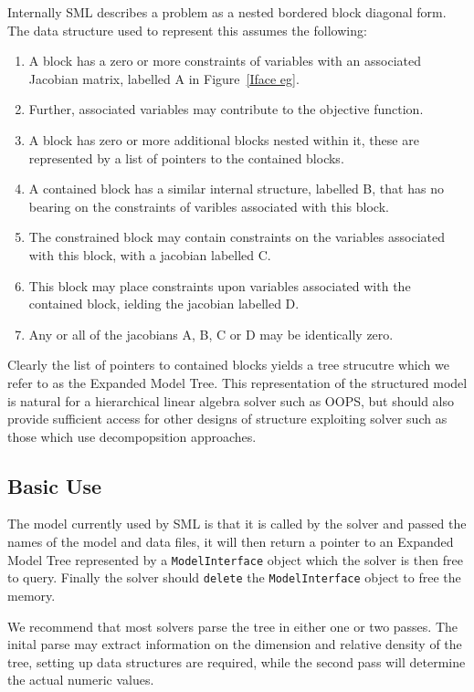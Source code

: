 \documentclass[10pt,a4paper]{book}
\begin{document}
Internally  SML describes a problem as a nested bordered block diagonal form.
The data structure used to represent this assumes the following:
\begin{enumerate}
   \item A block has a zero or more constraints of variables with an associated
      Jacobian matrix, labelled A in Figure~\ref{Iface eg}.
   \item Further, associated variables may contribute to the objective function.
   \item A block has zero or more additional blocks nested within it, these are
      represented by a list of pointers to the contained blocks.
   \item A contained block has a similar internal structure, labelled B, that
      has no bearing on the constraints of varibles associated with this block.
   \item The constrained block may contain constraints on the variables
      associated with this block, with a jacobian labelled C.
   \item This block may place constraints upon variables associated with
      the contained block, ielding the jacobian labelled D.
   \item Any or all of the jacobians A, B, C or D may be identically zero.
\end{enumerate}

Clearly the list of pointers to contained blocks yields a tree strucutre which
we refer to as the Expanded Model Tree.  This representation of the structured
model is natural for a hierarchical linear algebra solver such as OOPS, but
should also provide sufficient access for other designs of structure exploiting
solver such as those which use decompopsition approaches.

\subsection{Basic Use}

The model currently used by SML is that it is called by the solver and passed
the names of the model and data files, it will then return a pointer to an
Expanded Model Tree represented by a {\tt ModelInterface} object which the
solver is then free to query. Finally the solver should {\tt delete} the
{\tt ModelInterface} object to free the memory.

We recommend that most solvers parse the tree in either one or two passes. The
inital parse may extract information on the dimension and relative density of
the tree, setting up data structures are required, while the second pass will
determine the actual numeric values.
\end{document}
